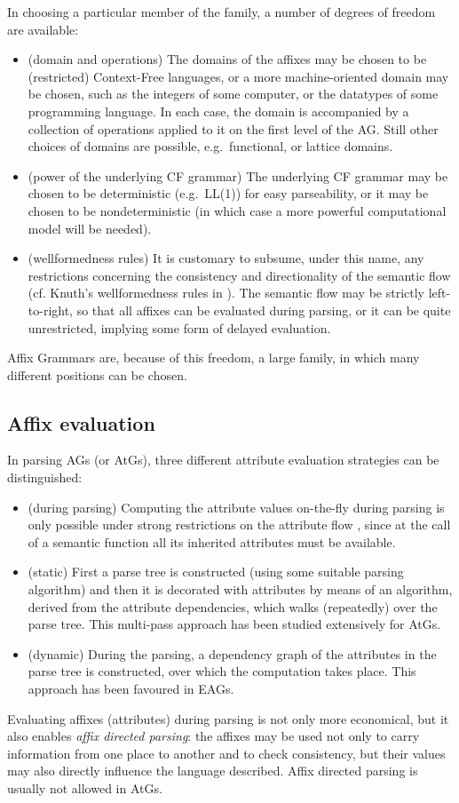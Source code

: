 In choosing a particular member of the family, a number of degrees of
freedom are available:
\begin{itemize}
\item (domain and operations) The domains of the affixes may be chosen to
be (restricted) Context-Free languages, or a more machine-oriented domain
may be chosen,
such as the integers of some computer, or the datatypes of some programming
language. In each case, the domain is accompanied by a collection of
operations applied to it on the first level of the AG. Still other
choices of domains are possible, e.g.\ functional, or lattice
\cite{moritz:diss} domains.
\item (power of the underlying CF grammar) The underlying CF grammar may
be chosen to be deterministic (e.g.\ LL(1)) for easy parseability,
or it may be chosen to be nondeterministic (in which case a more
powerful computational model will be needed).
\item (wellformedness rules) It is customary to subsume, under this
name, any restrictions concerning the consistency and directionality
of the semantic flow (cf. Knuth's wellformedness rules in \cite{knuth:atg}).
The semantic flow may be strictly left-to-right, so that all affixes can
be evaluated during parsing, or it can be quite unrestricted, implying
some form of delayed evaluation.
\end{itemize}
Affix Grammars are, because of this freedom, a large family, in which
many different positions can be chosen.
\subsection{Affix evaluation}
In parsing AGs (or AtGs), three different attribute evaluation strategies
can be distinguished:
\begin{itemize}
\item (during parsing) Computing the attribute values on-the-fly during
parsing is only possible under strong restrictions on the attribute flow
\cite{akker:attrevp}, since at the call of a semantic function
all its inherited attributes must be available.
\item (static) First a parse tree is constructed (using some
suitable parsing algorithm) and then it is decorated
with attributes by means of an algorithm, derived from the attribute
dependencies, which walks (repeatedly) over the parse tree.
This multi-pass approach has been studied extensively for AtGs.
\item (dynamic) During the parsing, a dependency graph of
the attributes in the parse tree is constructed, over which the computation
takes place. This approach has been favoured in EAGs.
\end{itemize}
Evaluating affixes (attributes) during parsing is not only more economical,
but it also enables {\em affix directed parsing}: the affixes
may be used not only to carry information from one place to another
and to check consistency, but their values may also directly influence
the language described. Affix directed parsing is usually
not allowed in AtGs.

